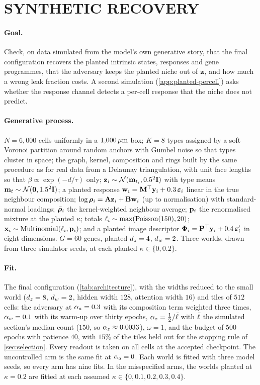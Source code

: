 \section{SYNTHETIC RECOVERY}
\label{app:synthetic}

\paragraph{Goal.} Check, on data simulated from the model's own generative story, that the final configuration recovers the planted intrinsic states, responses and gene programmes, that the adversary keeps the planted niche out of $\mathbf{z}$, and how much a wrong leak fraction costs. A second simulation (\cref{app:planted-percell}) asks whether the response channel detects a per-cell response that the niche does not predict.

\paragraph{Generative process.} $N = 6{,}000$ cells uniformly in a $1{,}000\,\mu\text{m}$ box; $K = 8$ types assigned by a soft Voronoi partition around random anchors with Gumbel noise so that types cluster in space; the graph, kernel, composition and rings built by the same procedure as for real data from a Delaunay triangulation, with unit face lengths so that $\beta \propto \exp(-d/\tau)$ only; $\mathbf{z}_i \sim \mathcal{N}(\mathbf{m}_{t_i}, 0.5^2\mathbf{I})$ with type means $\mathbf{m}_t \sim \mathcal{N}(\mathbf{0}, 1.5^2\mathbf{I})$; a planted response $\mathbf{w}_i = \mathbf{M}^\top\mathbf{y}_i + 0.3\,\boldsymbol\varepsilon_i$ linear in the true neighbour composition; $\log\boldsymbol{\rho}_i = \mathbf{A}\mathbf{z}_i + \mathbf{B}\mathbf{w}_i$ (up to normalisation) with standard-normal loadings; $\bar{\boldsymbol{\rho}}_i$ the kernel-weighted neighbour average; $\mathbf{p}_i$ the renormalised mixture at the planted $\kappa$; totals $\ell_i \sim \max(\operatorname{Poisson}(150), 20)$; $\mathbf{x}_i \sim \operatorname{Multinomial}(\ell_i, \mathbf{p}_i)$; and a planted image descriptor $\boldsymbol{\Phi}_i = \mathbf{P}^\top\mathbf{y}_i + 0.4\,\boldsymbol\varepsilon'_i$ in eight dimensions. $G = 60$ genes, planted $d_z = 4$, $d_w = 2$. Three worlds, drawn from three simulator seeds, at each planted $\kappa \in \{0, 0.2\}$.

\paragraph{Fit.} The final configuration (\cref{tab:architecture}), with the widths reduced to the small world ($d_z = 8$, $d_w = 2$, hidden width $128$, attention width $16$) and tiles of $512$ cells: the adversary at $\alpha_a = 0.3$ with its composition term weighted three times, $\alpha_w = 0.1$ with its warm-up over thirty epochs, $\alpha_z = \tfrac12/\bar{\ell}$ with $\bar{\ell}$ the simulated section's median count ($150$, so $\alpha_z \approx 0.0033$), $\omega = 1$, and the budget of $500$ epochs with patience $40$, with $15\%$ of the tiles held out for the stopping rule of \cref{sec:selection}. Every readout is taken on all cells at the accepted checkpoint. The uncontrolled arm is the same fit at $\alpha_a = 0$. Each world is fitted with three model seeds, so every arm has nine fits. In the misspecified arms, the worlds planted at $\kappa = 0.2$ are fitted at each assumed $\kappa \in \{0, 0.1, 0.2, 0.3, 0.4\}$.

